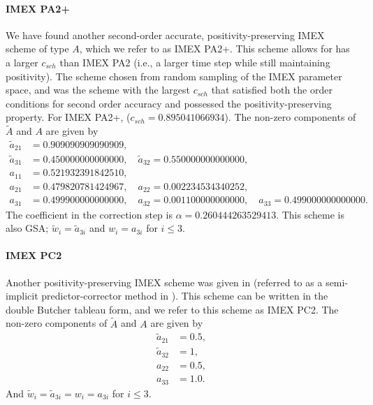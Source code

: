 \paragraph{IMEX PA2+}

We have found another second-order accurate, positivity-preserving IMEX scheme of type $A$, which we refer to as IMEX PA2+.  
This scheme allows for has a larger $c_{sch}$ than IMEX PA2 (i.e., a larger time step while still maintaining positivity).  
The scheme chosen from random sampling of the IMEX parameter space, and was the scheme with the largest $c_{sch}$ that satisfied both the order conditions for second order accuracy and possessed the positivity-preserving property.  
For IMEX PA2+, ($c_{sch} = 0.895041066934$). 
The non-zero components of $\tilde{A}$ and $A$ are given by
\begin{align}
  \tilde{a}_{21} &= 0.909090909090909, \nonumber \\
  \tilde{a}_{31} &= 0.450000000000000, \quad \tilde{a}_{32} = 0.550000000000000, \nonumber \\
  a_{11} &= 0.521932391842510, \nonumber \\
  a_{21} &= 0.479820781424967, \quad a_{22} = 0.002234534340252, \nonumber \\
  a_{31} &= 0.499900000000000, \quad a_{32} = 0.001100000000000, \quad a_{33} = 0.499000000000000. \nonumber
\end{align}
The coefficient in the correction step is $\alpha = 0.260444263529413$.  
This scheme is also GSA; $\tilde{w}_{i}=\tilde{a}_{3i}$ and $w_{i}=a_{3i}$ for $i\le3$.

\paragraph{IMEX PC2}

Another positivity-preserving IMEX scheme was given in \cite{mcclareen_2008} (referred to as a semi-implicit predictor-corrector method in \cite{mcclareen_2008}).  
This scheme can be written in the double Butcher tableau form, and we refer to this scheme as IMEX PC2.  
The non-zero components of $\tilde{A}$ and $A$ are given by
\begin{align}
  \tilde{a}_{21} &= 0.5, \nonumber \\
  \tilde{a}_{32} &= 1, \nonumber \\
  a_{22} &= 0.5, \nonumber \\
  a_{33} &= 1.0. \nonumber
\end{align}
And $\tilde{w}_{i}=\tilde{a}_{3i} = w_{i}=a_{3i}$ for $i\le3$.

